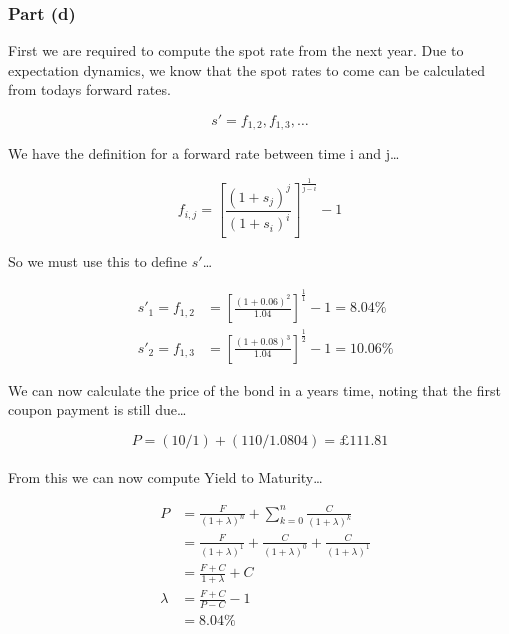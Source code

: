 \documentclass[11pt]{article}
\begin{document}
\subsubsection*{Part (d)}

First we are required to compute the spot rate from the next year. Due to expectation dynamics,
we know that the spot rates to come can be calculated from todays forward rates.

\[ s' = f_{1,2}, f_{1,3}, \dots \]

We have the definition for a forward rate between time i and j\dots

\[ f_{i,j} = \left[ \frac{\left(1 + s_{j}\right)^{j}}{\left(1 + s_{i}\right)^{i}} \right]^{\frac{1}{j - i}} - 1 \]

So we must use this to define $s'$\dots

\begin{eqnarray}
  & s'_{1} = f_{1,2} &= \left[ \frac{\left(1 + 0.06\right)^{2}}{1.04} \right]^{\frac{1}{1}} - 1 = 8.04\% \\
  & s'_{2} = f_{1,3} &= \left[ \frac{\left(1 + 0.08\right)^{3}}{1.04} \right]^{\frac{1}{2}} - 1 = 10.06\%
\end{eqnarray}

We can now calculate the price of the bond in a years time, noting that the first coupon payment is still due\dots

\[ P = \left(10 / 1\right) + \left(110 / 1.0804\right) = £111.81 \]
\\
From this we can now compute Yield to Maturity\dots

\begin{eqnarray}
  & P &= \frac{F}{\left(1 + \lambda\right)^{n}} + \sum_{k=0}^{n} \frac{C}{\left(1 + \lambda\right)^{k}} \\[4mm]
  &&= \frac{F}{\left(1 + \lambda\right)^{1}} + \frac{C}{\left(1 + \lambda\right)^{0}} + \frac{C}{\left(1 + \lambda\right)^{1}} \\[4mm]
  &&= \frac{F + C}{1 + \lambda} + C \\[4mm]
  & \lambda &= \frac{F + C}{P - C} - 1 \\[4mm]
  &&= 8.04\%
\end{eqnarray}
\end{document}
